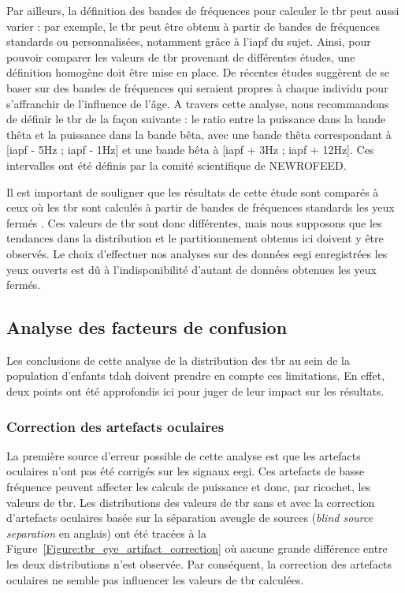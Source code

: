 Par ailleurs, la définition des bandes de fréquences pour calculer le \gls{tbr} peut aussi varier : par exemple, le \gls{tbr} peut être obtenu à partir
de bandes de fréquences standards ou personnalisées, notamment grâce à l'\gls{iapf} du sujet. Ainsi, pour pouvoir comparer les valeurs de \gls{tbr} provenant de différentes
études, une définition homogène doit être mise en place. De récentes études suggèrent de se baser sur des bandes de fréquences 
qui seraient propres à chaque individu \citep{Zhang2017, Saad2018} pour s'affranchir de l'influence de l'âge. A travers cette analyse, nous recommandons de définir le \gls{tbr} de la façon suivante : 
le ratio entre la puissance dans la bande thêta et la puissance dans la bande bêta, avec une bande thêta correspondant à [\gls{iapf} - 5Hz ; \gls{iapf} - 1Hz]
et une bande bêta à [\gls{iapf} + 3Hz ; \gls{iapf} + 12Hz]. Ces intervalles ont été définis par la comité scientifique de NEWROFEED. 

Il est important de souligner que les résultats de cette étude sont comparés à ceux où les \gls{tbr} sont calculés à partir de bandes de fréquences standards
les yeux fermés \citep{Zhang2017, Clarke2011}. Ces valeurs de \gls{tbr} sont donc différentes, mais nous supposons que les tendances dans la distribution et le
partitionnement obtenus ici doivent y être observés. Le choix d'effectuer nos analyses sur des données \gls{eegi} enregistrées les yeux ouverts est dû à l'indisponibilité
d'autant de données obtenues les yeux fermés.

\subsection{Analyse des facteurs de confusion}

Les conclusions de cette analyse de la distribution des \gls{tbr} au sein de la population d'enfants \gls{tdah} doivent prendre en compte ces limitations.
En effet, deux points ont été approfondis ici pour juger de leur impact sur les résultats.

\subsubsection{Correction des artefacts oculaires}

La première source d'erreur possible de cette analyse est que les artefacts oculaires n'ont pas été corrigés sur les signaux \gls{eegi}. Ces artefacts de basse fréquence
peuvent affecter les calculs de puissance et donc, par ricochet, les valeurs de \gls{tbr}. Les distributions des valeurs de \gls{tbr} sans et avec 
la correction d'artefacts oculaires basée sur la séparation aveugle de sources (\textit{blind source separation} en anglais) \citep{Barthelemy2017} 
ont été tracées à la Figure~\ref{Figure:tbr_eye_artifact_correction} où aucune grande différence entre les deux distributions n'est observée. Par conséquent, la correction des artefacts 
oculaires ne semble pas influencer les valeurs de \gls{tbr} calculées. 

